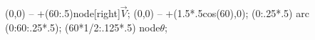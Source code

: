 \documentclass{standalone}
\begin{document}
\begin{myTikz}[]{1}
	\def\ang{60}
	\def\len{.5\w}
	 (0,0) -- +(\ang:\len)node[right]{$\vec{V}$};
	 (0,0) -- +({1.5*\len*cos(\ang)},0);
	 (0:{.25*\len}) arc (0:\ang:{.25*\len});
	\freedraw ({\ang*1/2}:.125*\len) node{$\theta$};
\end{myTikz}
\end{document}
